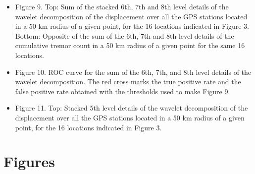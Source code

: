 \documentclass{article}
\begin{document}
\begin{itemize}
\item Figure 9. Top: Sum of the stacked 6th, 7th and 8th level details of the wavelet decomposition of the displacement over all the GPS stations located in a 50 km radius of a given point, for the 16 locations indicated in Figure 3. Bottom: Opposite of the sum of the 6th, 7th and 8th level details of the cumulative tremor count in a 50 km radius of a given point for the same 16 locations.

\item Figure 10. ROC curve for the sum of the 6th, 7th, and 8th level details of the wavelet decomposition. The red cross marks the true positive rate and the false positive rate obtained with the thresholds used to make Figure 9.

\item Figure 11. Top: Stacked 5th level details of the wavelet decomposition of the displacement over all the GPS stations located in a 50 km radius of a given point, for the 16 locations indicated in Figure 3.

\end {itemize}

\newpage

\section*{Figures}
\end{document}
